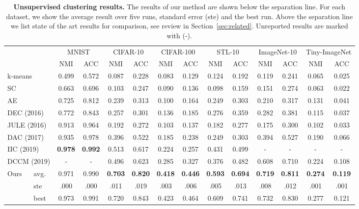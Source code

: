 \documentclass[a4paper,conference]{IEEEtran}
\begin{document}
\begin{table*}[t]
\small
\caption{\protect\justify \textbf{Unsupervised clustering results.} The results of our method are shown below the separation line. For each dataset, we show the average result over five runs, standard error (ste) and the best run. Above the separation line we list state of the art results for comparison, see review in Section~\ref{sec:related}. Unreported results are marked with (-).}

\begin{center}
\begin{tabular}{l l c c c c c c c c c c c c}
\toprule
&  & \multicolumn{2}{c}{MNIST} & \multicolumn{2}{c}{CIFAR-10} & \multicolumn{2}{c}{CIFAR-100} & \multicolumn{2}{c}{STL-10}  & \multicolumn{2}{c}{ImageNet-10} & \multicolumn{2}{c}{Tiny-ImageNet} \\
& & NMI & ACC & NMI & ACC & NMI & ACC & NMI & ACC & NMI & ACC & NMI & ACC \\
\midrule
\multicolumn{2}{l}{k-means} & 0.499 & 0.572 & 0.087 & 0.228 & 0.083 & 0.129 & 0.124 & 0.192 & 0.119 & 0.241 & 0.065 & 0.025 \\
\multicolumn{2}{l}{SC} & 0.663 & 0.696 & 0.103 & 0.247 & 0.090 & 0.136 & 0.098 & 0.159 & 0.151 & 0.274 & 0.063 & 0.022 \\
\multicolumn{2}{l}{AE} & 0.725 & 0.812 & 0.239 & 0.313 & 0.100 & 0.164 & 0.249 & 0.303 & 0.210 & 0.317 & 0.131 & 0.041 \\
\multicolumn{2}{l}{DEC (2016)} & 0.772 & 0.843 & 0.257 & 0.301 & 0.136 & 0.185 & 0.276 & 0.359 & 0.282 & 0.381 & 0.115 & 0.037 \\
\multicolumn{2}{l}{JULE (2016)} & 0.913 & 0.964 & 0.192 & 0.272 & 0.103 & 0.137 & 0.182 & 0.277 & 0.175 & 0.300 & 0.102 & 0.033 \\
\multicolumn{2}{l}{DAC (2017)} & 0.935 & 0.978 & 0.396 & 0.522 & 0.185 & 0.238 & 0.249 & 0.303 & 0.394 & 0.527 & 0.190 & 0.066 \\
\multicolumn{2}{l}{IIC (2019)}  & \textbf{0.978} & \textbf{0.992} & 0.513 & 0.617 & 0.224 & 0.257 & 0.431 & 0.499 & - & - & - & - \\
\multicolumn{2}{l}{DCCM (2019)} & - & - & 0.496 & 0.623 & 0.285 & 0.327 & 0.376 & 0.482 & 0.608 & 0.710 & 0.224 & 0.108 \\
\midrule
\multirow{3}{*}{Ours} & avg. & 0.971 & 0.990 & \textbf{0.703} & \textbf{0.820} & \textbf{0.418} & \textbf{0.446} & \textbf{0.593} & \textbf{0.694} & \textbf{0.719} & \textbf{0.811} & \textbf{0.274} & \textbf{0.119} \\
& ste & .000 & .000 & .011 & .019 & .003 & .006 & .005 & .013 & .008 & .012 & .001 & .001 \\
& best & 0.973 & 0.991 & 0.720 & 0.843 & 0.423 & 0.464 & 0.609 & 0.741 & 0.732 & 0.830 & 0.277 & 0.121 \\
\bottomrule
\end{tabular}
\end{center}
\label{table:3}
\end{table*}
\end{document}
